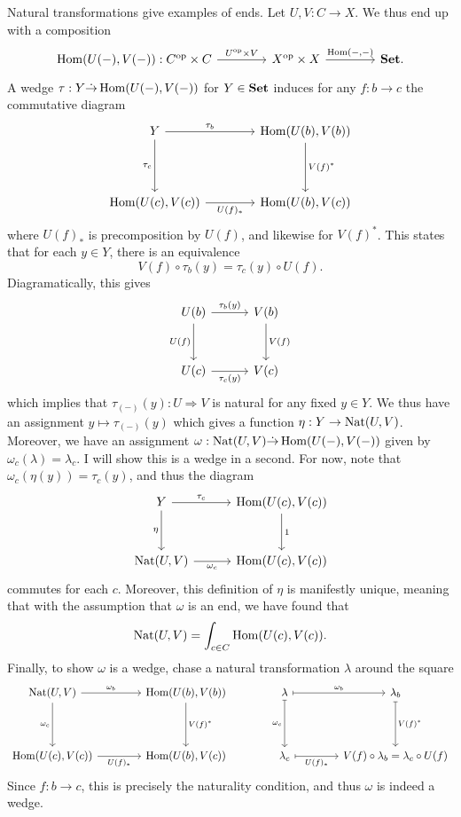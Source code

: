 Natural transformations give examples of ends. Let $U,V : C \to X$. We thus end up with a composition
\[\begin{tikzcd}[row sep = 4em, column sep = 4em]
\Hom(U(-), V(-)) : C^{\mathrm{op} } \times C \ar[" U^{\mathrm{op} } \times V ", r]  & X^{\mathrm{op} } \times X \ar[" \Hom(-\text{,} -)  ", r]  & \Set .
\end{tikzcd}\]
A wedge $\tau : Y \dot{\to } \operatorname{Hom}(U(-), V(-)) $ for $Y\in \mathbf{Set} $ induces for any $f : b \to c$ the commutative diagram
\[\begin{tikzcd}[row sep = 4em, column sep = 4em]
	Y \ar[" \tau_b ", r] \ar[" \tau_c "', d]  & \Hom(U(b), V(b)) \ar[" V(f)^* ", d]  \\
\Hom(U(c), V(c)) \ar[" U(f)_* "', r]  & \Hom(U(b), V(c)) 
\end{tikzcd}\]
where $U(f)_*$ is precomposition by $U(f)$, and likewise for $V(f)^*$. This states that for each $y\in Y$, there is an equivalence
\[
	V(f)\circ \tau_b(y)=\tau_c(y)\circ U(f)
.\]
Diagramatically, this gives
\[\begin{tikzcd}[row sep = 3em, column sep = 3em]
U(b)\ar[" \tau_b(y) ", r] \ar[" U(f) "', d]  & V(b)\ar[" V(f) ", d]  \\
U(c)\ar[" \tau_c(y) "', r]  & V(c)
\end{tikzcd}\]
which implies that $\tau_{(-)} (y): U \Rightarrow V$ is natural for any fixed $y\in Y$. We thus have an assignment $y\mapsto \tau_{(-)} (y)$ which gives a function $\eta:Y \to \operatorname{Nat}(U,V)$. Moreover, we have an assignment $\omega : \operatorname{Nat}(U,V) \dot{\to } \operatorname{Hom}(U(-), V(-)) $ given by $\omega_c(\lambda)=\lambda_c$. I will show this is a wedge in a second. For now, note that $\omega_c(\eta(y))=\tau_c(y)$, and thus the diagram
\[\begin{tikzcd}[row sep = 3em, column sep = 3em]
Y \ar[" \tau_c ", r] \ar[" \eta "', d]  & \Hom(U(c), V(c)) \ar[" 1 ", d]  \\
\Nat(U,V)\ar[" \omega_c "', r]  & \Hom(U(c), V(c)) 
\end{tikzcd}\]
commutes for each $c$. Moreover, this definition of $\eta$ is manifestly unique, meaning that with the assumption that $\omega$ is an end, we have found that
\[
	\operatorname{Nat}(U,V)=\int_{c\in C} \operatorname{Hom}(U(c), V(c)) 
.\]
Finally, to show $\omega$ is a wedge, chase a natural transformation $\lambda$ around the square
\[\begin{tikzcd}[row sep = 4em, column sep = 4em]
\Nat(U,V)\ar[" \omega_b ", r] \ar[" \omega_c "', d]  & \Hom(U(b), V(b)) \ar[" V(f)^* ", d]  & \lambda \ar[" \omega_b ", mapsto, r] \ar[" \omega_c "', mapsto, d]  & \lambda_b \ar[" V(f)^* ", mapsto, d]  \\
\Hom(U(c), V(c)) \ar[" U(f)_* "', r]  & \Hom(U(b), V(c))  & \lambda_c \ar[" U(f)_* "', mapsto, r]  & V(f)\circ \lambda_b = \lambda_c \circ U(f)
\end{tikzcd}\]
Since $f : b \to c$, this is precisely the naturality condition, and thus $\omega$ is indeed a wedge.

